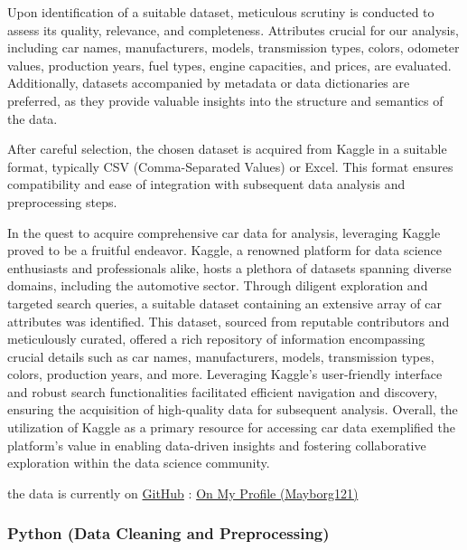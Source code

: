 \documentclass{article}
\begin{document}
{Upon identification of a suitable dataset, meticulous scrutiny is conducted to assess its quality, relevance, and completeness. Attributes crucial for our analysis, including car names, manufacturers, models, transmission types, colors, odometer values, production years, fuel types, engine capacities, and prices, are evaluated. Additionally, datasets accompanied by metadata or data dictionaries are preferred, as they provide valuable insights into the structure and semantics of the data.

After careful selection, the chosen dataset is acquired from Kaggle in a suitable format, typically CSV (Comma-Separated Values) or Excel. This format ensures compatibility and ease of integration with subsequent data analysis and preprocessing steps.

In the quest to acquire comprehensive car data for analysis, leveraging Kaggle proved to be a fruitful endeavor. Kaggle, a renowned platform for data science enthusiasts and professionals alike, hosts a plethora of datasets spanning diverse domains, including the automotive sector. Through diligent exploration and targeted search queries, a suitable dataset containing an extensive array of car attributes was identified. This dataset, sourced from reputable contributors and meticulously curated, offered a rich repository of information encompassing crucial details such as car names, manufacturers, models, transmission types, colors, production years, and more. Leveraging Kaggle's user-friendly interface and robust search functionalities facilitated efficient navigation and discovery, ensuring the acquisition of high-quality data for subsequent analysis. Overall, the utilization of Kaggle as a primary resource for accessing car data exemplified the platform's value in enabling data-driven insights and fostering collaborative exploration within the data science community.

the data is currently on \href{https://raw.githubusercontent.com/Mayborg121/Car_DataAnalysis_Dashboard/main/Car%20Dashboard/src/Raw/cars_data_raw.csv}{GitHub} : \href{https://github.com/Mayborg121/Car_DataAnalysis_Dashboard}{On My Profile (Mayborg121)}
\subsubsection{ Python (Data Cleaning and Preprocessing)}

}
\end{document}
